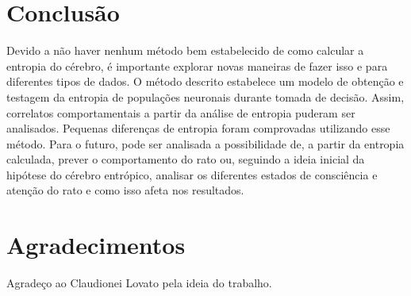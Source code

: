 \documentclass[conference]{IEEEtran}
\begin{document}
\section{Conclusão}

Devido a não haver nenhum método bem estabelecido de como calcular a entropia do cérebro, é importante explorar novas maneiras de fazer isso e para diferentes tipos de dados.
O método descrito estabelece um modelo de obtenção e testagem da entropia de populações neuronais durante tomada de decisão. Assim, correlatos comportamentais a partir da análise de entropia puderam ser analisados. Pequenas diferenças de entropia foram comprovadas utilizando esse método. Para o futuro, pode ser analisada a possibilidade de, a partir da entropia calculada, prever o comportamento do rato ou, seguindo a ideia inicial da hipótese do cérebro entrópico, analisar os diferentes estados de consciência e atenção do rato e como isso afeta nos resultados. 

\section*{Agradecimentos}

Agradeço ao Claudionei Lovato pela ideia do trabalho.

  

\end{document}
